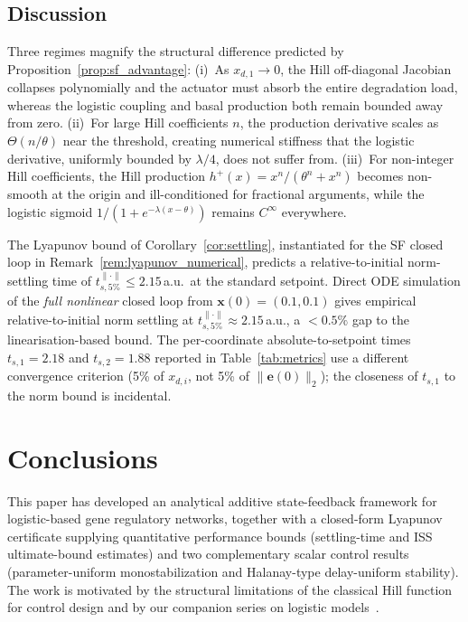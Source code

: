\documentclass[12pt]{article}
\begin{document}
\subsection{Discussion}
Three regimes magnify the structural difference predicted by
Proposition~\ref{prop:sf_advantage}: (i)~As $x_{d,1}\to 0$, the Hill
off-diagonal Jacobian collapses polynomially and the actuator must
absorb the entire degradation load, whereas the logistic coupling and
basal production both remain bounded away from zero. (ii)~For large
Hill coefficients $n$, the production derivative scales as
$\Theta(n/\theta)$ near the threshold, creating numerical stiffness
that the logistic derivative, uniformly bounded by $\lambda/4$, does
not suffer from. (iii)~For non-integer Hill coefficients, the Hill
production $h^+(x)=x^n/(\theta^n+x^n)$ becomes non-smooth at the origin
and ill-conditioned for fractional arguments, while the logistic
sigmoid $1/(1+e^{-\lambda(x-\theta)})$ remains $C^\infty$ everywhere.

The Lyapunov bound of Corollary~\ref{cor:settling}, instantiated for
the SF closed loop in Remark~\ref{rem:lyapunov_numerical}, predicts a
relative-to-initial norm-settling time of
$t_{s,5\%}^{\|\cdot\|}\le 2.15$\,a.u.\ at the standard setpoint. Direct
ODE simulation of the \emph{full nonlinear} closed loop from
$\mathbf{x}(0)=(0.1,0.1)$ gives empirical relative-to-initial norm
settling at $t_{s,5\%}^{\|\cdot\|}\approx 2.15$\,a.u., a $<0.5\%$ gap
to the linearisation-based bound. The per-coordinate absolute-to-setpoint
times $t_{s,1}=2.18$ and $t_{s,2}=1.88$ reported in
Table~\ref{tab:metrics} use a different convergence criterion
(5\% of $x_{d,i}$, not 5\% of $\|\mathbf{e}(0)\|_2$); the closeness
of $t_{s,1}$ to the norm bound is incidental.

\section{Conclusions}
\label{sec:conclusion}

This paper has developed an analytical additive state-feedback framework for
logistic-based gene regulatory networks, together with a closed-form Lyapunov
certificate supplying quantitative performance bounds (settling-time and ISS
ultimate-bound estimates) and two complementary scalar control results
(parameter-uniform monostabilization and Halanay-type delay-uniform stability).
The work is motivated by the structural limitations of the classical Hill
function for control design and by our companion series on logistic
models~\cite{belgacem2025exploring,belgacem2026logistic,belgacem2026beyond}.
\end{document}
